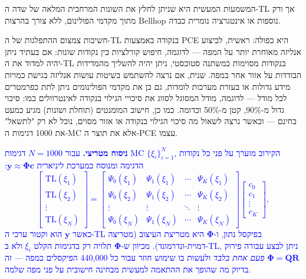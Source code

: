 \documentclass[12pt,a4paper]{article}
\newcommand{\TL}{\mathrm{TL}}
\DeclareRobustCommand{\aiedit}[1]{\textcolor{blue}{#1}}
\begin{document}
המשמעות המעשית היא שניתן לחלץ את השונות המרחבית המלאה של שדה ה-\textenglish{TL} אך ורק מתוך מקדמי הפולינום, ללא צורך בהרצות \textenglish{Bellhop} נוספות או אינטגרציה נומרית כבדה.

חשיבות צמצום ההתפלגות של ה-\textenglish{TL} בנקודה באמצעות \textenglish{PCE} היא כפולה:
ראשית, לביצוע אנליזה מאוחרת יותר על המפה — לדוגמה, חיפוש קורלציות בין נקודות שונות:
אם בעתיד ניתן יהיה למדוד את ה-\textenglish{TL} בנקודות מסוימות כמשתנה סטוכסטי,
ניתן יהיה להשליך מהמדידות הבודדות על אזור אחר במפה.
שנית, אם נרצה להשתמש בשיטות עושות אנליזה בגישת כמויות מידע גדולות או בעזרת מערכות לומדות,
גם כן את מקדמי הפולינומים ניתן לתת כפרמטרים לכל מודל —
לדוגמה, מודל המסוגל לסווג את סיכויי הגילוי בנקודה לאינטרוולים כמו: סיכוי גדול מ-90\%{}, קטן מ-50\%{} וכדומה.
כמו כן, חישוב המומנטים (תוחלת ושונות) מגיע כמעט בחינם —
וכאשר נרצה לשאול מה סיכוי הגילוי בנקודה או אזור מסוים,
נוכל לא רק "לתשאל" את 1000 דגימות ה-\textenglish{MC} אלא את תוצר ה-\textenglish{PCE} עצמו.

\aiedit{\textbf{ניסוח מטריצי.} עבור $N=1000$ דגימות MC $\{\xi_i\}_{i=1}^N$, הקירוב מוערך על פני
כל נקודות הדגימה ומנוסח כמערכת ליניארית $\mathbf{y}\approx\boldsymbol{\Phi}\mathbf{c}$:
\[
  \begin{bmatrix} \TL(\xi_1) \\ \TL(\xi_2) \\ \vdots \\ \TL(\xi_N) \end{bmatrix}
  =
  \begin{bmatrix}
    \Psi_0(\xi_1) & \Psi_1(\xi_1) & \cdots & \Psi_K(\xi_1) \\
    \Psi_0(\xi_2) & \Psi_1(\xi_2) & \cdots & \Psi_K(\xi_2) \\
    \vdots        & \vdots        & \ddots & \vdots        \\
    \Psi_0(\xi_N) & \Psi_1(\xi_N) & \cdots & \Psi_K(\xi_N)
  \end{bmatrix}
  \begin{bmatrix} c_0 \\ c_1 \\ \vdots \\ c_K \end{bmatrix},
\]
כאשר $\mathbf{y}$ הוא וקטור ערכי ה-TL בפיקסל נתון, ו-$\boldsymbol{\Phi}$ היא מטריצת העיצוב
(מטריצה דמוית-ונדרמונד). מכיוון ש-$\boldsymbol{\Phi}$ תלויה רק בדגימות הקלט $\xi_i$ ולא ב-TL,
ניתן לבצע עבורה פירוק $\boldsymbol{\Phi}=\mathbf{Q}\mathbf{R}$ \emph{פעם אחת בלבד} ולעשות בו
שימוש חוזר עבור כל 440{,}000 הפיקסלים במפה — זה בדיוק מה שהופך את ההתאמה למעשית מבחינה
חישובית על פני מפה שלמה.}
\end{document}
